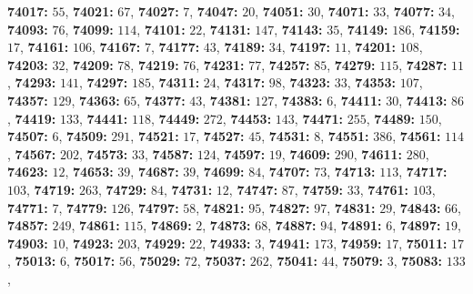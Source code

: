 \textsf{\bfseries 74017:} $55$, \textsf{\bfseries 74021:} $67$, \textsf{\bfseries 74027:} $7$, \textsf{\bfseries 74047:} $20$, \textsf{\bfseries 74051:} $30$, \textsf{\bfseries 74071:} $33$, \textsf{\bfseries 74077:} $34$, \textsf{\bfseries 74093:} $76$, \textsf{\bfseries 74099:} $114$, \textsf{\bfseries 74101:} $22$, \textsf{\bfseries 74131:} $147$, \textsf{\bfseries 74143:} $35$, \textsf{\bfseries 74149:} $186$, \textsf{\bfseries 74159:} $17$, \textsf{\bfseries 74161:} $106$, \textsf{\bfseries 74167:} $7$, \textsf{\bfseries 74177:} $43$, \textsf{\bfseries 74189:} $34$, \textsf{\bfseries 74197:} $11$, \textsf{\bfseries 74201:} $108$, \textsf{\bfseries 74203:} $32$, \textsf{\bfseries 74209:} $78$, \textsf{\bfseries 74219:} $76$, \textsf{\bfseries 74231:} $77$, \textsf{\bfseries 74257:} $85$, \textsf{\bfseries 74279:} $115$, \textsf{\bfseries 74287:} $11$, \textsf{\bfseries 74293:} $141$, \textsf{\bfseries 74297:} $185$, \textsf{\bfseries 74311:} $24$, \textsf{\bfseries 74317:} $98$, \textsf{\bfseries 74323:} $33$, \textsf{\bfseries 74353:} $107$, \textsf{\bfseries 74357:} $129$, \textsf{\bfseries 74363:} $65$, \textsf{\bfseries 74377:} $43$, \textsf{\bfseries 74381:} $127$, \textsf{\bfseries 74383:} $6$, \textsf{\bfseries 74411:} $30$, \textsf{\bfseries 74413:} $86$, \textsf{\bfseries 74419:} $133$, \textsf{\bfseries 74441:} $118$, \textsf{\bfseries 74449:} $272$, \textsf{\bfseries 74453:} $143$, \textsf{\bfseries 74471:} $255$, \textsf{\bfseries 74489:} $150$, \textsf{\bfseries 74507:} $6$, \textsf{\bfseries 74509:} $291$, \textsf{\bfseries 74521:} $17$, \textsf{\bfseries 74527:} $45$, \textsf{\bfseries 74531:} $8$, \textsf{\bfseries 74551:} $386$, \textsf{\bfseries 74561:} $114$, \textsf{\bfseries 74567:} $202$, \textsf{\bfseries 74573:} $33$, \textsf{\bfseries 74587:} $124$, \textsf{\bfseries 74597:} $19$, \textsf{\bfseries 74609:} $290$, \textsf{\bfseries 74611:} $280$, \textsf{\bfseries 74623:} $12$, \textsf{\bfseries 74653:} $39$, \textsf{\bfseries 74687:} $39$, \textsf{\bfseries 74699:} $84$, \textsf{\bfseries 74707:} $73$, \textsf{\bfseries 74713:} $113$, \textsf{\bfseries 74717:} $103$, \textsf{\bfseries 74719:} $263$, \textsf{\bfseries 74729:} $84$, \textsf{\bfseries 74731:} $12$, \textsf{\bfseries 74747:} $87$, \textsf{\bfseries 74759:} $33$, \textsf{\bfseries 74761:} $103$, \textsf{\bfseries 74771:} $7$, \textsf{\bfseries 74779:} $126$, \textsf{\bfseries 74797:} $58$, \textsf{\bfseries 74821:} $95$, \textsf{\bfseries 74827:} $97$, \textsf{\bfseries 74831:} $29$, \textsf{\bfseries 74843:} $66$, \textsf{\bfseries 74857:} $249$, \textsf{\bfseries 74861:} $115$, \textsf{\bfseries 74869:} $2$, \textsf{\bfseries 74873:} $68$, \textsf{\bfseries 74887:} $94$, \textsf{\bfseries 74891:} $6$, \textsf{\bfseries 74897:} $19$, \textsf{\bfseries 74903:} $10$, \textsf{\bfseries 74923:} $203$, \textsf{\bfseries 74929:} $22$, \textsf{\bfseries 74933:} $3$, \textsf{\bfseries 74941:} $173$, \textsf{\bfseries 74959:} $17$, \textsf{\bfseries 75011:} $17$, \textsf{\bfseries 75013:} $6$, \textsf{\bfseries 75017:} $56$, \textsf{\bfseries 75029:} $72$, \textsf{\bfseries 75037:} $262$, \textsf{\bfseries 75041:} $44$, \textsf{\bfseries 75079:} $3$, \textsf{\bfseries 75083:} $133$, 
